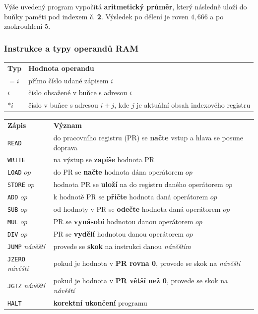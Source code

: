 Výše uvedený program vypočítá \textbf{aritmetický průměr}, který následně uloží do buňky paměti pod indexem č. \textbf{2}. Výsledek po dělení je roven $4,666$ a po zaokrouhlení $5$.

\subsubsection{Instrukce a typy operandů RAM}
\begin{table}[H]
\centering
\begin{tabular}{l|l}
\textbf{Typ} & \textbf{Hodnota operandu} \\ \hhline	
$=i$ & přímo číslo udané zápisem $i$  \\
$i$ & číslo obsažené v buňce s adresou $i$   \\
$*i$ & číslo v buňce s adresou $i + j$, kde $j$ je aktuální obsah indexového registru
\end{tabular}
\end{table}

\begin{table}[H]
\centering
\begin{tabular}{l|l}
\textbf{Zápis} & \textbf{Význam} \\ \hhline	
\texttt{READ} & do pracovního registru (PR) se \textbf{načte} vstup a hlava se posune
doprava \\
\texttt{WRITE} & na výstup se \textbf{zapíše} hodnota PR \\
\texttt{LOAD} $op$ & do PR se \textbf{načte} hodnota dána operátorem $op$  \\
\texttt{STORE} $op$ & hodnota PR se \textbf{uloží} na do registru daného operátorem $op$ \\
\texttt{ADD} $op$ & k hodnotě PR se \textbf{přičte} hodnota daná operátorem $op$  \\
\texttt{SUB} $op$ &  od hodnoty v PR se \textbf{odečte} hodnota daná operátorem $op$ \\
\texttt{MUL} $op$ &  PR se \textbf{vynásobí} hodnotou danou operátorem $op$ \\
\texttt{DIV} $op$ &  PR se \textbf{vydělí} hodnotou danou operátorem $op$ \\
\texttt{JUMP} \textit{návěští} & provede se \textbf{skok} na instrukci danou \textit{návěštím} \\
\texttt{JZERO} \textit{návěští} & pokud je hodnota v \textbf{PR rovna 0}, provede se skok na \textit{návěští} \\
\texttt{JGTZ} \textit{návěští} & pokud je hodnota v \textbf{PR větší než 0}, provede se skok na \textit{návěští} \\
\texttt{HALT} & \textbf{korektní ukončení} programu \\

\end{tabular}
\end{table}

